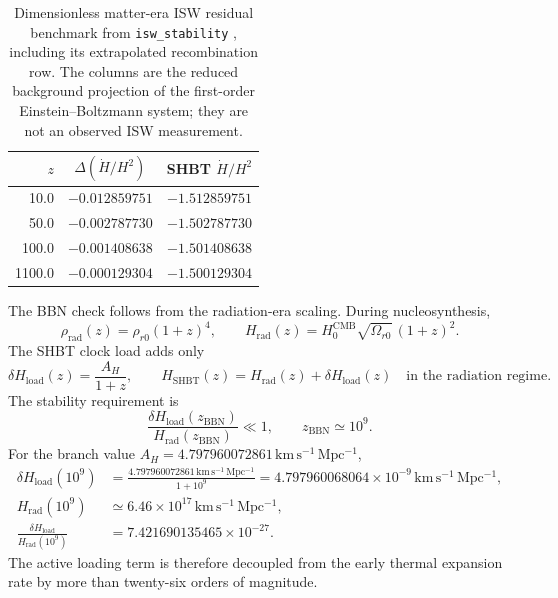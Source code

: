 \documentclass[11pt,letterpaper]{article}
\theoremstyle{plain}
\DeclareRobustCommand{\pyvar}[1]{%
  \ifmmode\text{\nolinkurl{#1}}\else\nolinkurl{#1}\fi%
}
\newcommand{\hcmb}{H_0^{\text{CMB}}}
\newcommand{\kmsmpc}{\mathrm{km\,s^{-1}\,Mpc^{-1}}}
\newcommand{\AH}{A_H}
\begin{document}
\begin{table}[htbp]
\centering
\small
\begin{tabular}{@{}rcc@{}}
\toprule
\(z\) & \(\Delta(\dot H/H^2)\) & SHBT \(\dot H/H^2\) \\
\midrule
10.0 & \(-0.012859751\) & \(-1.512859751\) \\
50.0 & \(-0.002787730\) & \(-1.502787730\) \\
100.0 & \(-0.001408638\) & \(-1.501408638\) \\
1100.0 & \(-0.000129304\) & \(-1.500129304\) \\
\bottomrule
\end{tabular}
\caption{Dimensionless matter-era ISW residual benchmark from
\pyvar{isw_stability}, including its extrapolated recombination row.  The
columns are the reduced background projection of the first-order
Einstein--Boltzmann system; they are not an observed ISW measurement.}
\label{tab:isw-stability-audit}
\end{table}

The BBN check follows from the radiation-era scaling.  During nucleosynthesis,
\begin{equation}
\label{eq:bbn-radiation-density}
 \rho_{\text{rad}}(z)
 =
 \rho_{r0}(1+z)^4,
 \qquad
 H_{\text{rad}}(z)
 =
 \hcmb\sqrt{\Omega_{r0}}\,(1+z)^2.
\end{equation}
The SHBT clock load adds only
\begin{equation}
\label{eq:bbn-loading-shift}
 \delta H_{\text{load}}(z)
 =
 \frac{\AH}{1+z},
 \qquad
 H_{\text{SHBT}}(z)
 =
 H_{\text{rad}}(z)+\delta H_{\text{load}}(z)
 \quad
 \text{in the radiation regime}.
\end{equation}
The stability requirement is
\begin{equation}
\label{eq:bbn-stability-condition}
 \frac{\delta H_{\text{load}}(z_{\text{BBN}})}
 {H_{\text{rad}}(z_{\text{BBN}})}
 \ll1,
 \qquad
 z_{\text{BBN}}\simeq10^9.
\end{equation}
For the branch value \(\AH=4.797960072861\,\kmsmpc\),
\begin{align}
\label{eq:bbn-loading-stability}
 \delta H_{\text{load}}(10^9)
 &=
 \frac{4.797960072861\,\kmsmpc}{1+10^9}
 =
 4.797960068064\times10^{-9}\,\kmsmpc,\\
 H_{\text{rad}}(10^9)
 &\simeq
 6.46\times10^{17}\,\kmsmpc,\\
 \frac{\delta H_{\text{load}}}{H_{\text{rad}}(10^9)}
 &=
 7.421690135465\times10^{-27}.
\end{align}
The active loading term is therefore decoupled from the early thermal
expansion rate by more than twenty-six orders of magnitude.
\end{document}
